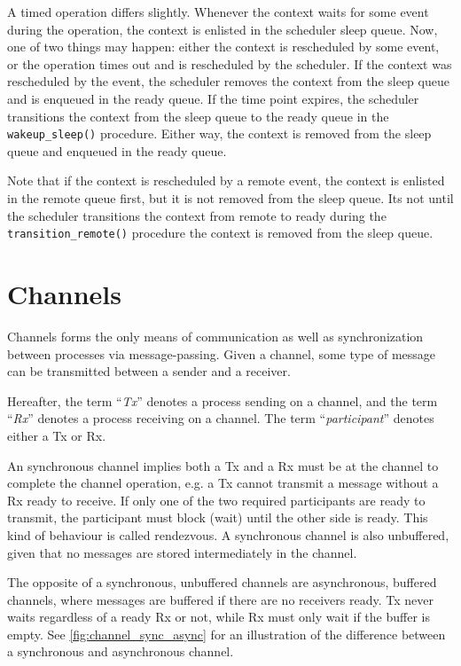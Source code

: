 A timed operation differs slightly. Whenever the context waits for some event during the operation, the context is enlisted in the scheduler sleep queue. Now, one of two things may happen: either the context is rescheduled by some event, or the operation times out and is rescheduled by the scheduler. If the context was rescheduled by the event, the scheduler removes the context from the sleep queue and is enqueued in the ready queue. If the time point expires, the scheduler transitions the context from the sleep queue to the ready queue in the \texttt{wakeup\_sleep()} procedure. Either way, the context is removed from the sleep queue and enqueued in the ready queue.

Note that if the context is rescheduled by a remote event, the context is enlisted in the remote queue first, but it is not removed from the sleep queue. Its not until the scheduler transitions the context from remote to ready during the \texttt{transition\_remote()} procedure the context is removed from the sleep queue.


\FloatBarrier
\section{Channels}
\label{sec:channels}

Channels forms the only means of communication as well as synchronization between processes via message\hyp{}passing. Given a channel, some type of message can be transmitted between a sender and a receiver.

Hereafter, the term ``\textit{Tx}'' denotes a process sending on a channel, and the term ``\textit{Rx}'' denotes a process receiving on a channel. The term ``\textit{participant}'' denotes either a Tx or Rx.

An synchronous channel implies both a Tx and a Rx must be at the channel to complete the channel operation, e.g. a Tx cannot transmit a message without a Rx ready to receive. If only one of the two required participants are ready to transmit, the participant must block (wait) until the other side is ready. This kind of behaviour is called rendezvous. A synchronous channel is also unbuffered, given that no messages are stored intermediately in the channel.

The opposite of a synchronous, unbuffered channels are asynchronous, buffered channels, where messages are buffered if there are no receivers ready. Tx never waits regardless of a ready Rx or not, while Rx must only wait if the buffer is empty. See \cref{fig:channel_sync_async} for an illustration of the difference between a synchronous and asynchronous channel.


